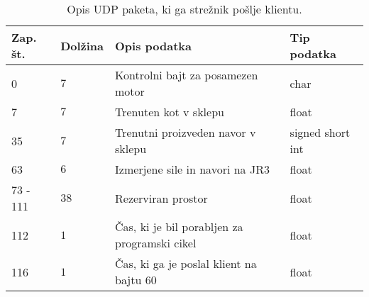 
\begin{table}[h]
	\centering
	\begin{footnotesize}
		\begin{tabular}{|l l l l |}
		\hline
		Zap. \v{s}t. &  Dol\v{z}ina& Opis podatka & Tip podatka\\ \hline
		0 & $7$ & Kontrolni bajt za posamezen motor & char \\
		7 & $7$ & Trenuten kot v sklepu & float \\
		35 & $7$ & Trenutni proizveden navor v sklepu & signed short int \\
		63 & $6$ & Izmerjene sile in navori na JR3 & float\\
		73 - 111 & $38$ & Rezerviran prostor & float\\
		112 & $1$ & \v{C}as, ki je bil porabljen za programski cikel & float\\
		116 & $1$ & \v{C}as, ki ga je poslal klient na bajtu 60 & float\\ \hline
		\end{tabular}
	\end{footnotesize}
	\caption{Opis UDP paketa, ki ga stre\v{z}nik po\v{s}lje klientu.}
	\label{table:udp-reply}
\end{table}